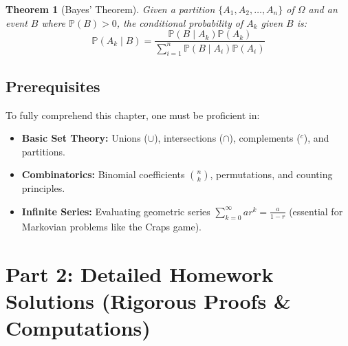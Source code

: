 \documentclass[11pt, letterpaper]{article}
\newtheorem{theorem}{Theorem}[section]
\theoremstyle{definition}
\renewcommand{\P}{\mathbb{P}}
\begin{document}
\begin{theorem}[Bayes' Theorem]
Given a partition $\{A_1, A_2, \dots, A_n\}$ of $\Omega$ and an event $B$ where $\P(B) > 0$, the conditional probability of $A_k$ given $B$ is:
\[ \P(A_k \mid B) = \frac{\P(B \mid A_k)\P(A_k)}{\sum_{i=1}^{n} \P(B \mid A_i)\P(A_i)} \]
\end{theorem}

\subsection{Prerequisites}
To fully comprehend this chapter, one must be proficient in:
\begin{itemize}
    \item \textbf{Basic Set Theory:} Unions ($\cup$), intersections ($\cap$), complements ($^c$), and partitions.
    \item \textbf{Combinatorics:} Binomial coefficients $\binom{n}{k}$, permutations, and counting principles.
    \item \textbf{Infinite Series:} Evaluating geometric series $\sum_{k=0}^{\infty} ar^k = \frac{a}{1-r}$ (essential for Markovian problems like the Craps game).
\end{itemize}

\newpage
\section{Part 2: Detailed Homework Solutions (Rigorous Proofs \& Computations)}
\end{document}
